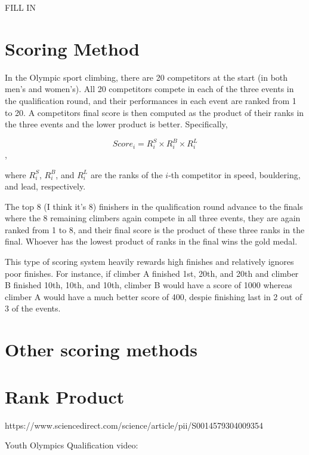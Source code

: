 \documentclass{article}\usepackage[]{graphicx}\usepackage[]{color}
\begin{document}
FILL IN 

\section{Scoring Method}
In the Olympic sport climbing, there are 20 competitors at the start (in both men's and women's).  All 20 competitors compete in each of the three events in the qualification round, and their performances in each event are ranked from 1 to 20.  A competitors final score is then computed as the product of their ranks in the three events and the lower product is better.  Specifically, 

$$
Score_i = R^S_i \times R^B_i \times R^L_i
$$, 

where $R^S_i$, $R^B_i$, and $R^L_i$ are the ranks of the $i$-th competitor in speed, bouldering, and lead, respectively.  

The top 8 (I think it's 8) finishers in the qualification round advance to the finals where the 8 remaining climbers again compete in all three events, they are again ranked from 1 to 8, and their final score is the product of these three ranks in the final.  Whoever has the lowest product of ranks in the final wins the gold medal.  

This type of scoring system heavily rewards high finishes and relatively ignores poor finishes.  For instance, if climber A finished 1st, 20th, and 20th and climber B finished 10th, 10th, and 10th, climber B would have a score of 1000 whereas climber A would have a much better score of 400, despie finishing last in 2 out of 3 of the events.  

\section{Other scoring methods}


\section{Rank Product}
https://www.sciencedirect.com/science/article/pii/S0014579304009354








Youth Olympics Qualification video: %



\end{document}
